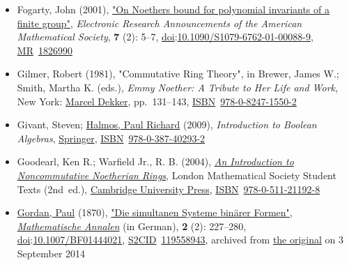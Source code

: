 \begin{itemize}
\item
  Fogarty, John (2001), \href{https://www.ams.org/era/2001-07-02/S1079-6762-01-00088-9/}{"On Noether\textquotesingle s bound for polynomial invariants of a finite group"}, \emph{Electronic Research Announcements of the American Mathematical Society}, \textbf{7} (2): {5--}7, \href{https://en.wikipedia.org/wiki/Doi_(identifier)}{doi}:{\href{https://doi.org/10.1090\%2FS1079-6762-01-00088-9}{10.1090/S1079-6762-01-00088-9}}, \href{https://en.wikipedia.org/wiki/MR_(identifier)}{MR}{~}\href{https://mathscinet.ams.org/mathscinet-getitem?mr=1826990}{1826990}{}
\item
  Gilmer, Robert (1981), "Commutative Ring Theory", in Brewer, James W.; Smith, Martha K. (eds.), \emph{Emmy Noether: A Tribute to Her Life and Work}, New York: \href{https://en.wikipedia.org/wiki/Marcel_Dekker}{Marcel Dekker}, pp.{~}{131--}143, \href{https://en.wikipedia.org/wiki/ISBN_(identifier)}{ISBN}{~}\href{https://en.wikipedia.org/wiki/Special:BookSources/978-0-8247-1550-2}{978-0-8247-1550-2}{}
\item
  Givant, Steven; \href{https://en.wikipedia.org/wiki/Paul_Halmos}{Halmos, Paul Richard} (2009), \emph{Introduction to Boolean Algebras}, \href{https://en.wikipedia.org/wiki/Springer_Science+Business_Media}{Springer}, \href{https://en.wikipedia.org/wiki/ISBN_(identifier)}{ISBN}{~}\href{https://en.wikipedia.org/wiki/Special:BookSources/978-0-387-40293-2}{978-0-387-40293-2}{}
\item
  Goodearl, Ken R.; Warfield Jr., R. B. (2004), \href{https://books.google.com/books?id=vXh1MtvQr_8C}{\emph{An Introduction to Noncommutative Noetherian Rings}}, London Mathematical Society Student Texts (2nd{~}ed.), \href{https://en.wikipedia.org/wiki/Cambridge_University_Press}{Cambridge University Press}, \href{https://en.wikipedia.org/wiki/ISBN_(identifier)}{ISBN}{~}\href{https://en.wikipedia.org/wiki/Special:BookSources/978-0-511-21192-8}{978-0-511-21192-8}{}
\item
  \href{https://en.wikipedia.org/wiki/Paul_Gordan}{Gordan, Paul} (1870), \href{https://web.archive.org/web/20140903095153/http://gdz.sub.uni-goettingen.de/index.php?id=11&PPN=GDZPPN002240513&L=1}{"Die simultanen Systeme binärer Formen"}, \emph{\href{https://en.wikipedia.org/wiki/Mathematische_Annalen}{Mathematische Annalen}} (in German), \textbf{2} (2): {227--}280, \href{https://en.wikipedia.org/wiki/Doi_(identifier)}{doi}:\href{https://doi.org/10.1007\%2FBF01444021}{10.1007/BF01444021}, \href{https://en.wikipedia.org/wiki/S2CID_(identifier)}{S2CID}{~}\href{https://api.semanticscholar.org/CorpusID:119558943}{119558943}, archived from \href{http://gdz.sub.uni-goettingen.de/index.php?id=11&PPN=GDZPPN002240513&L=1}{the original} on 3 September 2014{}

\end{itemize}
